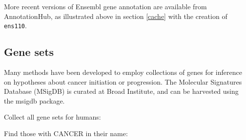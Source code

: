 \begin{shaded}
\begin{Highlighting}[]
\NormalTok{(}\NormalTok{(}
\NormalTok{(}\NormalTok{(}\OperatorTok{$}
\CommentTok{\#\# }
\end{Highlighting}
\end{shaded}

More recent versions of Ensembl gene annotation are available
from AnnotationHub, as illustrated above in section \ref{cache} with
the creation of \texttt{ens110}.

\subsection{Gene sets}\label{gene-sets}

Many methods have been developed to employ collections
of genes for inference on hypotheses about cancer
initiation or progression. The Molecular Signatures Database (MSigDB)
is curated at Broad Institute, and can be harvested
using the msigdb package.

Collect all gene sets for humans:

\begin{shaded}
\begin{Highlighting}[]
\StringTok{ }\NormalTok{(}\NormalTok{, }\NormalTok{, }\NormalTok{())}
\end{Highlighting}
\end{shaded}

Find those with CANCER in their name:

